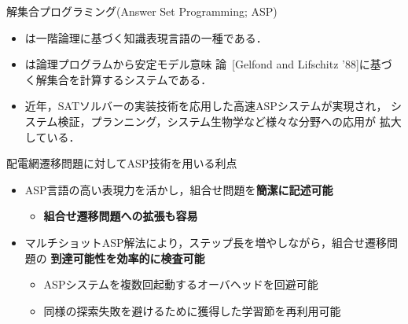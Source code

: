\documentclass[dvipdfmx,11pt]{beamer}
\begin{document}
\begin{frame}{解集合プログラミング(Answer Set Programming; ASP)}
\vfill
 \begin{itemize}
  \item {}は一階論理に基づく知識表現言語の一種である．
  \item {}は論理プログラムから安定モデル意味
        論~[Gelfond and Lifschitz '88]に基づく解集合を計算するシステムである．
  \item 近年，SATソルバーの実装技術を応用した高速ASPシステムが実現され，
        システム検証，プランニング，システム生物学など様々な分野への応用が
        拡大している．
 \end{itemize}
 \vfill
 \begin{alertblock}{配電網遷移問題に対してASP技術を用いる利点}
  \begin{itemize}
   \item ASP言語の高い表現力を活かし，組合せ問題を\textbf{簡潔に記述可能}
         \begin{itemize}
          \item \alert{\bf 組合せ遷移問題への拡張も容易}
         \end{itemize}
   \item マルチショットASP解法により，ステップ長を増やしながら，組合せ遷移問題の
         \alert{\bf 到達可能性を効率的に検査可能}
         \begin{itemize}
          \item ASPシステムを複数回起動するオーバヘッドを回避可能
          \item 同様の探索失敗を避けるために獲得した学習節を再利用可能
         \end{itemize}
  \end{itemize}
 \end{alertblock} \vfill
\end{frame}
\end{document}
